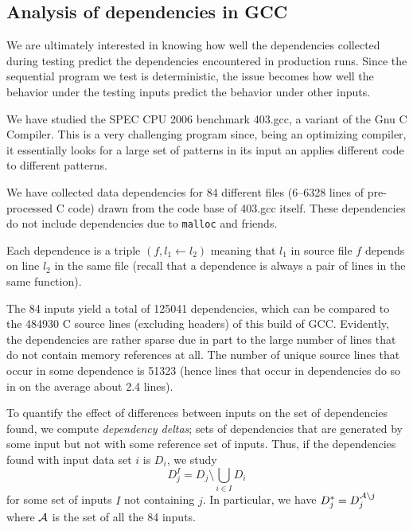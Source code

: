 \documentclass[times, 10pt,twocolumn]{article}
\begin{document}
\subsection{Analysis of dependencies in GCC} \label{sgcc}

We are ultimately interested in knowing how well the dependencies
collected during testing predict the dependencies encountered in
production runs.  Since the sequential program we test is
deterministic, the issue becomes how well the behavior under the
testing inputs predict the behavior under other inputs.

We have studied the SPEC CPU 2006
benchmark 403.gcc, a variant of the Gnu C
Compiler. This is a very challenging program since, being an
optimizing compiler, it essentially looks for a large set of patterns
in its input an applies different code to different patterns.

We have collected data dependencies for 84 different files
(6--6328 lines of pre-processed C code) drawn from the code base of
403.gcc itself. These dependencies do not include dependencies due to
{\tt malloc} and friends.

Each dependence is a triple $(f, l_1 \leftarrow l_2)$
meaning that $l_1$ in source file $f$ depends on line
$l_2$ in the same file (recall that a dependence is always a
pair of lines in the same function). 

The 84 inputs yield a total of 125041 dependencies, which
can be compared to the 484930 C source lines (excluding headers) of
this build of GCC. Evidently, the dependencies are rather sparse due
in part to the large number of lines that do not contain memory references at all.
The number of unique source lines that occur in some dependence is
51323 (hence lines that occur in dependencies do so in on the average
about 2.4 lines). %

To quantify the effect of differences between inputs on the set of 
dependencies found, we compute {\em dependency deltas}; sets of
dependencies that are generated by some input but not with some
reference set of inputs. Thus, if the dependencies found with input data set $i$ is
$D_i$, we study \[D_j^I = D_j \setminus \bigcup_{i \in I} D_i\] for
some set of inputs $I$ not containing $j$. In particular, we have
$D_j^\ast = D_j^{{\cal A} \setminus j}$ where $\cal A$ is the set of
all the 84 inputs.
\end{document}

